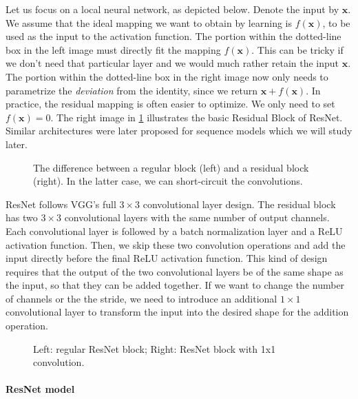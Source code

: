 Let us focus on a local neural network, as depicted below. Denote the input by $\mathbf{x}$. We assume that the ideal mapping we want to obtain by learning is $f(\mathbf{x})$, to be used as the input to the activation function. The portion within the dotted-line box in the left image must directly fit the mapping $f(\mathbf{x})$. This can be tricky if we don't need that particular layer and we would much rather retain the input $\mathbf{x}$. The portion within the dotted-line box in the right image now only needs to parametrize the \textit{deviation} from the identity, since we return $\mathbf{x} + f(\mathbf{x})$. In practice, the residual mapping is often easier to optimize. We only need to set $f(\mathbf{x}) = 0$. The right image in \cref{fig:residual-block} illustrates the basic Residual Block of ResNet. Similar architectures were later proposed for sequence models which we will study later.

\begin{figure}[hpt]
	\centering
	
	\caption{The difference between a regular block (left) and a residual block (right). In the latter case, we can short-circuit the convolutions.}
	\label{fig:residual-block}
\end{figure}

ResNet follows VGG's full $3\times 3$ convolutional layer design. The residual block has two $3\times 3$ convolutional layers with the same number of output channels. Each convolutional layer is followed by a batch normalization layer and a ReLU activation function. Then, we skip these two convolution operations and add the input directly before the final ReLU activation function. This kind of design requires that the output of the two convolutional layers be of the same shape as the input, so that they can be added together. If we want to change the number of channels or the the stride, we need to introduce an additional $1\times 1$ convolutional layer to transform the input into the desired shape for the addition operation. 

\begin{figure}[hpt]
	\centering
	
	\caption{Left: regular ResNet block; Right: ResNet block with 1x1 convolution.}
	\label{fig:resnetblock}
\end{figure}

\paragraph{ResNet model}


